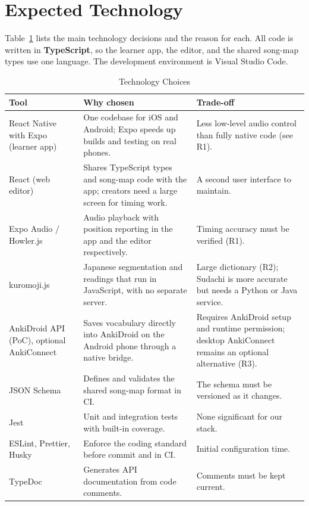 \documentclass{article}
\begin{document}
\section{Expected Technology}

Table~\ref{TblTech} lists the main technology decisions and the reason for
each. All code is written in \textbf{TypeScript}, so the learner app, the
editor, and the shared song-map types use one language. The development
environment is Visual Studio Code.

\begin{table}[h!]
\caption{Technology Choices} \label{TblTech}
\begin{tabularx}{\textwidth}{>{\raggedright\arraybackslash}p{}>{\raggedright\arraybackslash}X>{\raggedright\arraybackslash}X}
\toprule
\textbf{Tool} & \textbf{Why chosen} & \textbf{Trade-off}\\
\midrule
React Native with Expo (learner app) & One codebase for iOS and Android; Expo speeds up builds and testing on real phones. & Less low-level audio control than fully native code (see R1).\\
React (web editor) & Shares TypeScript types and song-map code with the app; creators need a large screen for timing work. & A second user interface to maintain.\\
Expo Audio / Howler.js & Audio playback with position reporting in the app and the editor respectively. & Timing accuracy must be verified (R1).\\
kuromoji.js & Japanese segmentation and readings that run in JavaScript, with no separate server. & Large dictionary (R2); Sudachi is more accurate but needs a Python or Java service.\\
AnkiDroid API (PoC), optional AnkiConnect & Saves vocabulary directly into AnkiDroid on the Android phone through a native bridge. & Requires AnkiDroid setup and runtime permission; desktop AnkiConnect remains an optional alternative (R3).\\
JSON Schema & Defines and validates the shared song-map format in CI. & The schema must be versioned as it changes.\\
Jest & Unit and integration tests with built-in coverage. & None significant for our stack.\\
ESLint, Prettier, Husky & Enforce the coding standard before commit and in CI. & Initial configuration time.\\
TypeDoc & Generates API documentation from code comments. & Comments must be kept current.\\
\bottomrule
\end{tabularx}
\end{table}
\end{document}
